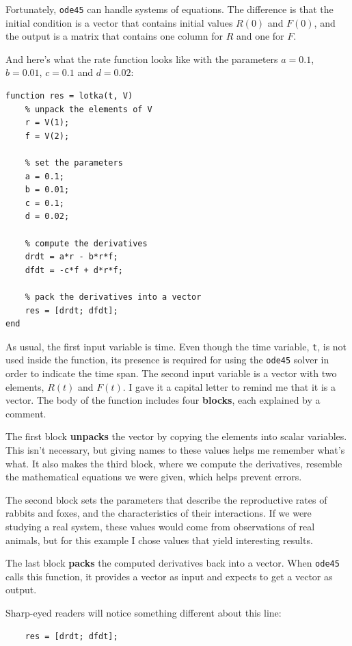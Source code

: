 \documentclass{book}
\begin{document}
Fortunately, {\tt ode45} can handle systems of equations.  The
difference is that the initial condition is a vector that contains
initial values $R(0)$ and $F(0)$, and the output is a matrix
that contains one column for $R$ and one for $F$.

And here's what the rate function looks like
with the parameters $a = 0.1$, $b = 0.01$, $c = 0.1$ and $d = 0.02$:

\begin{verbatim}
function res = lotka(t, V)
    % unpack the elements of V
    r = V(1);
    f = V(2);

    % set the parameters
    a = 0.1;
    b = 0.01;
    c = 0.1;
    d = 0.02;

    % compute the derivatives
    drdt = a*r - b*r*f;
    dfdt = -c*f + d*r*f;

    % pack the derivatives into a vector
    res = [drdt; dfdt];
end
\end{verbatim}

As usual, the first input variable is time.
Even though the time variable, {\tt t},
is not used inside the function, its presence is required for
using the {\tt ode45} solver in order to indicate the time span.
The second input variable is a vector with two elements,
$R(t)$ and $F(t)$.  I gave it a capital letter to remind me that it
is a vector.  The body of the function includes four {\bf blocks},
each explained by a comment.

The first block {\bf unpacks} the vector by copying the elements
into scalar variables.  This isn't necessary, but giving names to
these values helps me remember what's what.  It also makes the third
block, where we compute the derivatives, resemble the mathematical
equations we were given, which helps prevent errors.

The second block sets the parameters that describe the
reproductive rates of rabbits and foxes, and the characteristics of
their interactions.  If we were studying a real system, these values
would come from observations of real animals, but for this example
I chose values that yield interesting results.

The last block {\bf packs} the computed derivatives back into a
vector.  When {\tt ode45} calls this function, it provides a vector
as input and expects to get a vector as output.

Sharp-eyed readers will notice something different about this line:

\begin{verbatim}
    res = [drdt; dfdt];
\end{verbatim}
\end{document}
